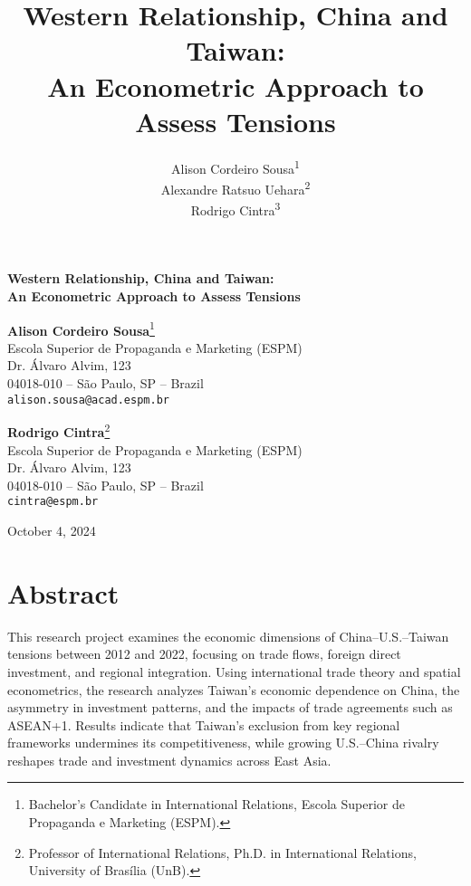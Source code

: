 \documentclass{article}
\title{Western Relationship, China and Taiwan: \\ An Econometric Approach to Assess Tensions}
\author{
    Alison Cordeiro Sousa\textsuperscript{1} \\
    Alexandre Ratsuo Uehara\textsuperscript{2} \\
    Rodrigo Cintra\textsuperscript{3}
}
\date{}
\begin{document}
\fontsize{12pt}{18pt}\selectfont

\begin{center}
{\LARGE \textbf{Western Relationship, China and Taiwan: \\ An Econometric Approach to Assess Tensions}}

\vspace{1.5cm}

\textbf{Alison Cordeiro Sousa}\footnote{Bachelor’s Candidate in International Relations, Escola Superior de Propaganda e Marketing (ESPM).}\\
Escola Superior de Propaganda e Marketing (ESPM)\\
Dr. Álvaro Alvim, 123\\
04018-010 – São Paulo, SP – Brazil\\
\texttt{alison.sousa@acad.espm.br}

\vspace{1cm}


\textbf{Rodrigo Cintra}\footnote{Professor of International Relations, Ph.D. in International Relations, University of Brasília (UnB).}\\
Escola Superior de Propaganda e Marketing (ESPM)\\
Dr. Álvaro Alvim, 123\\
04018-010 – São Paulo, SP – Brazil\\
\texttt{cintra@espm.br}

\vspace{1.5cm}

October 4, 2024
\end{center}

\thispagestyle{empty} %

\newpage

\section*{Abstract}
This research project examines the economic dimensions of China–U.S.–Taiwan tensions between 2012 and 2022, focusing on trade flows, foreign direct investment, and regional integration. Using international trade theory and spatial econometrics, the research analyzes Taiwan’s economic dependence on China, the asymmetry in investment patterns, and the impacts of trade agreements such as ASEAN+1. Results indicate that Taiwan’s exclusion from key regional frameworks undermines its competitiveness, while growing U.S.–China rivalry reshapes trade and investment dynamics across East Asia.
\end{document}
